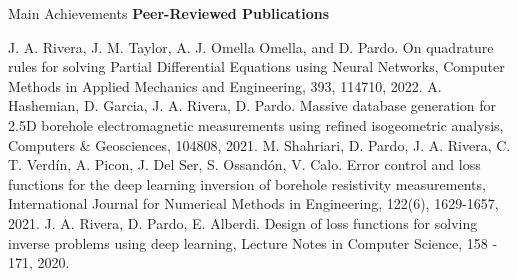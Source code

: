 \begin{frame}{Main Achievements}
\textbf{Peer-Reviewed Publications}
\begin{thebibliography}{2}
 {\small J. A. Rivera, J. M. Taylor, A. J. Omella Omella, and D. Pardo. On quadrature rules for solving Partial Differential Equations using Neural Networks, Computer Methods in Applied Mechanics and Engineering, 393, 114710, 2022.}
 {\small A. Hashemian, D. Garcia, J. A. Rivera, D. Pardo. Massive database generation for 2.5D borehole electromagnetic measurements using refined
isogeometric analysis, Computers \& Geosciences, 104808, 2021.}
 {\small M. Shahriari, D. Pardo, J. A. Rivera, C. T. Verdín, A. Picon, J. Del Ser, S. Ossandón, V. Calo. Error control and loss functions for the deep learning inversion of borehole resistivity measurements, International Journal for Numerical Methods in Engineering, 122(6), 1629-1657, 2021.}
 {\small J. A. Rivera, D. Pardo, E. Alberdi. Design of loss functions for solving inverse problems using deep learning, Lecture Notes in Computer
Science, 158 - 171, 2020.}
\end{thebibliography}
\end{frame}


